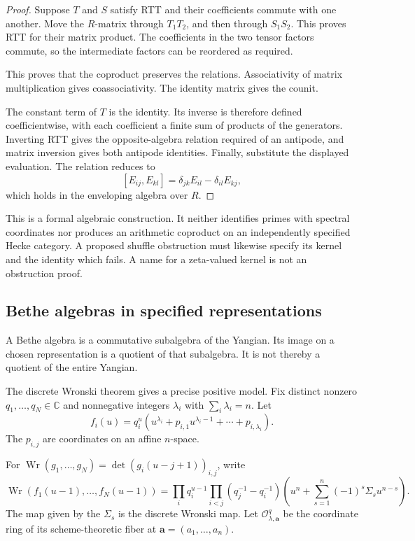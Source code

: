 \begin{proof}
Suppose \(T\) and \(S\) satisfy RTT and their coefficients
commute with one another. Move the \(R\)-matrix through
\(T_1T_2\), and then through \(S_1S_2\).
This proves RTT for their matrix product. The coefficients in the two tensor factors commute,
so the intermediate factors can be reordered as required.

This proves that the coproduct preserves the relations.
Associativity of matrix multiplication gives coassociativity.
The identity matrix gives the counit.

The constant term of \(T\) is the identity.
Its inverse is therefore defined coefficientwise, with each
coefficient a finite sum of products of the generators.
Inverting RTT gives the opposite-algebra relation required of
an antipode, and matrix inversion gives both antipode identities.
Finally, substitute the displayed evaluation. The relation reduces
to
\[
 [E_{ij},E_{kl}]
   =\delta_{jk}E_{il}-\delta_{il}E_{kj},
\]
which holds in the enveloping algebra over \(R\).
\end{proof}

This is a formal algebraic construction. It neither identifies
primes with spectral coordinates nor produces an arithmetic
coproduct on an independently specified Hecke category.
A proposed shuffle obstruction must likewise specify its kernel
and the identity which fails. A name for a zeta-valued kernel
is not an obstruction proof.

\subsection{Bethe algebras in specified representations}

A Bethe algebra is a commutative subalgebra of the Yangian.
Its image on a chosen representation is a quotient of that
subalgebra. It is not thereby a quotient of the entire Yangian.

The discrete Wronski theorem gives a precise positive model.
Fix distinct nonzero \(q_1,\ldots,q_N\in\mathbb C\) and
nonnegative integers \(\lambda_i\) with \(\sum_i\lambda_i=n\).
Let
\[
 f_i(u)=q_i^u
       (u^{\lambda_i}+p_{i,1}u^{\lambda_i-1}
                      +\cdots+p_{i,\lambda_i}).
\]
The \(p_{i,j}\) are coordinates on an affine \(n\)-space.

For \(\operatorname{Wr}(g_1,\ldots,g_N)
=\det(g_i(u-j+1))_{i,j}\), write
\[
 \operatorname{Wr}(f_1(u-1),\ldots,f_N(u-1))
 =\prod_iq_i^{u-1}
   \prod_{i<j}(q_j^{-1}-q_i^{-1})
   \left(u^n+\sum_{s=1}^n(-1)^s\Sigma_su^{n-s}\right).
\]
The map given by the \(\Sigma_s\) is the discrete Wronski map.
Let \(\mathcal O_{\lambda,\mathbf a}^q\) be the coordinate ring
of its scheme-theoretic fiber at
\(\mathbf a=(a_1,\ldots,a_n)\).

